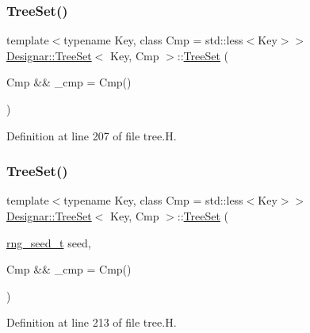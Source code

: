 \subsubsection{\texorpdfstring{Tree\+Set()}{TreeSet()}\hspace{0.1cm}{\footnotesize\ttfamily [3/7]}}
{\footnotesize\ttfamily template$<$typename Key, class Cmp = std\+::less$<$\+Key$>$$>$ \\
\hyperlink{class_designar_1_1_tree_set}{Designar\+::\+Tree\+Set}$<$ Key, Cmp $>$\+::\hyperlink{class_designar_1_1_tree_set}{Tree\+Set} (\begin{DoxyParamCaption}\item[{Cmp \&\&}]{\+\_\+cmp = {\ttfamily Cmp()} }\end{DoxyParamCaption})\hspace{0.3cm}{\ttfamily [inline]}}



Definition at line 207 of file tree.\+H.

\mbox{\label{class_designar_1_1_tree_set_a18b64c4f5ac3d0a4eb4d4e242ea4b4df}} 
\subsubsection{\texorpdfstring{Tree\+Set()}{TreeSet()}\hspace{0.1cm}{\footnotesize\ttfamily [4/7]}}
{\footnotesize\ttfamily template$<$typename Key, class Cmp = std\+::less$<$\+Key$>$$>$ \\
\hyperlink{class_designar_1_1_tree_set}{Designar\+::\+Tree\+Set}$<$ Key, Cmp $>$\+::\hyperlink{class_designar_1_1_tree_set}{Tree\+Set} (\begin{DoxyParamCaption}\item[{\hyperlink{namespace_designar_ad621b5646d45288c5d6a1e1dfe7531a8}{rng\+\_\+seed\+\_\+t}}]{seed,  }\item[{Cmp \&\&}]{\+\_\+cmp = {\ttfamily Cmp()} }\end{DoxyParamCaption})\hspace{0.3cm}{\ttfamily [inline]}}



Definition at line 213 of file tree.\+H.

\mbox{\label{class_designar_1_1_tree_set_adca348df928acd414db780df7ba541c1}} 
